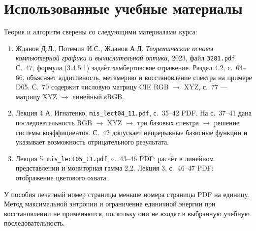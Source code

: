 \documentclass[a4paper,12pt]{article}
\newcommand{\code}[1]{\nolinkurl{#1}}
\begin{document}
\section{Использованные учебные материалы}
Теория и алгоритм сверены со следующими материалами курса:
\begin{enumerate}
\item Жданов Д.Д., Потемин И.С., Жданов А.Д. \emph{Теоретические основы компьютерной графики и вычислительной оптики}, 2023, файл \code{3281.pdf}. С.~47, формула (3.4.5.1) задаёт ламбертовское отражение. Раздел 4.2, с.~64--66, объясняет аддитивность, метамерию и восстановление спектра на примере D65. С.~70 содержит числовую матрицу CIE RGB $\to$ XYZ, с.~77 --- матрицу XYZ $\to$ линейный sRGB.
\item Лекция 4 А. Игнатенко, \code{mis_lect04_11.pdf}, с.~35--42 PDF. На с.~37--41 дана последовательность RGB $\to$ XYZ $\to$ три базовых спектра $\to$ решение системы коэффициентов. С.~42 допускает непрерывные базисные функции и указывает возможность отрицательного результата.
\item Лекция 5, \code{mis_lect05_11.pdf}, с.~43--46 PDF: расчёт в линейном представлении и мониторная гамма 2,2. Лекция 3, с.~46--47 PDF: отображение цветового охвата.
\end{enumerate}
У пособия печатный номер страницы меньше номера страницы PDF на единицу. Метод максимальной энтропии и ограничение единичной энергии при восстановлении не применяются, поскольку они не входят в выбранную учебную последовательность.


\end{document}
